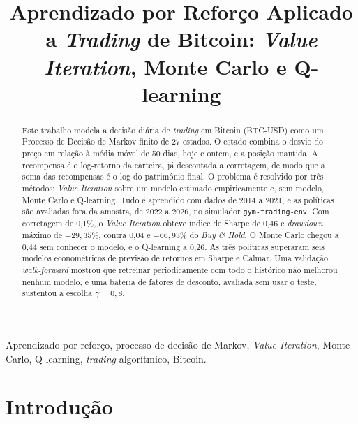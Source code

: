 \documentclass[conference]{IEEEtran}
\begin{document}
\title{Aprendizado por Reforço Aplicado a \textit{Trading} de Bitcoin: \textit{Value Iteration}, Monte Carlo e Q-learning}

\author{
}

\maketitle

\begin{abstract}
Este trabalho modela a decisão diária de \textit{trading} em Bitcoin (BTC-USD) como um Processo de Decisão de Markov finito de 27 estados. O estado combina o desvio do preço em relação à média móvel de 50 dias, hoje e ontem, e a posição mantida. A recompensa é o log-retorno da carteira, já descontada a corretagem, de modo que a soma das recompensas é o log do patrimônio final. O problema é resolvido por três métodos: \textit{Value Iteration} sobre um modelo estimado empiricamente e, sem modelo, Monte Carlo e Q-learning. Tudo é aprendido com dados de 2014 a 2021, e as políticas são avaliadas fora da amostra, de 2022 a 2026, no simulador \texttt{gym-trading-env}. Com corretagem de 0,1\%, o \textit{Value Iteration} obteve índice de Sharpe de 0,46 e \textit{drawdown} máximo de $-29{,}35\%$, contra 0,04 e $-66{,}93\%$ do \textit{Buy \& Hold}. O Monte Carlo chegou a 0,44 sem conhecer o modelo, e o Q-learning a 0,26. As três políticas superaram seis modelos econométricos de previsão de retornos em Sharpe e Calmar. Uma validação \textit{walk-forward} mostrou que retreinar periodicamente com todo o histórico não melhorou nenhum modelo, e uma bateria de fatores de desconto, avaliada sem usar o teste, sustentou a escolha $\gamma = 0{,}8$.
\end{abstract}

\begin{IEEEkeywords}
Aprendizado por reforço, processo de decisão de Markov, \textit{Value Iteration}, Monte Carlo, Q-learning, \textit{trading} algorítmico, Bitcoin.
\end{IEEEkeywords}

\section{Introdução}
\end{document}
